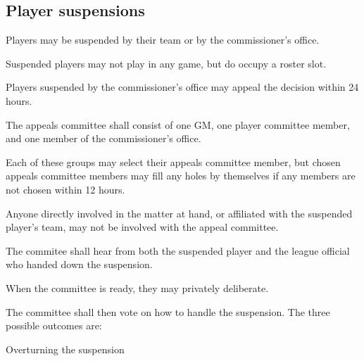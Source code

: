 \subsection{Player suspensions}
\begin{deepEnumerate}
      \item Players may be suspended by their team or by the commissioner’s office.
            \begin{deepEnumerate}
                  \item Suspended players may not play in any game, but do occupy a roster slot.
            \end{deepEnumerate}
      \item Players suspended by the commissioner’s office may appeal the decision within 24 hours.
            \begin{deepEnumerate}
                  \item The appeals committee shall consist of 
                        one GM, one player committee member, and one member of the commissioner’s office.
                        \begin{deepEnumerate}
                              \item Each of these groups may select their appeals committee member,
                                    but chosen appeals committee members may fill any holes by themselves
                                    if any members are not chosen within 12 hours.
                              \item Anyone directly involved in the matter at hand,
                                    or affiliated with the suspended player's team,
                                    may not be involved with the appeal committee.
                        \end{deepEnumerate}
                  \item The commitee shall hear from both the suspended player
                        and the league official who handed down the suspension.
                  \item When the committee is ready, they may privately deliberate.
                  \item The committee shall then vote on how to handle the suspension.
                        The three possible outcomes are:
                        \begin{deepEnumerate}
                              \item Overturning the suspension
                                    \begin{deepEnumerate}

\end{deepEnumerate}
\end{deepEnumerate}
\end{deepEnumerate}
\end{deepEnumerate}
